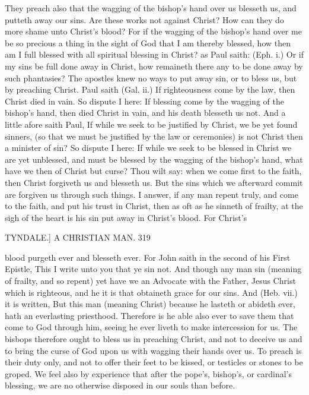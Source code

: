 \documentclass{custom}
\begin{document}
{They preach also that the wagging of the bishop's hand 
over us blesseth us, and putteth away our sins. Are these 
works not against Christ? How can they do more shame 
unto Christ's blood? For if the wagging of the bishop's 
hand over me be so precious a thing in the sight of God 
that I am thereby blessed, how then am I full blessed with 
all spiritual blessing in Christ? as Paul saith: (Eph. i.) 
Or if my sins be full done away in Christ, how remaineth 
there any to be done away by such phantasies? The 
apostles knew no ways to put away sin, or to bless us, but by 
preaching Christ. Paul saith (Gal. ii.) If righteousness 
come by the law, then Christ died in vain. So dispute I 
here: If blessing come by the wagging of the bishop's 
hand, then died Christ in vain, and his death blesseth us 
not. And a little afore saith Paul, If while we seek to be 
justified by Christ, we be yet found sinners, (so that we 
must be justified by the law or ceremonies) is not Christ 
then a minister of sin? So dispute I here: If while we 
seek to be blessed in Christ we are yet unblessed, and 
must be blessed by the wagging of the bishop's hand, what 
have we then of Christ but curse? Thou wilt say: when we 
come first to the faith, then Christ forgiveth us and 
blesseth us. But the sins which we afterward commit are 
forgiven us through such things. I answer, if any man 
repent truly, and come to the faith, and put his trust in 
Christ, then as oft as he sinneth of frailty, at the sigh of the 
heart is his sin put away in Christ's blood. For Christ's 


TYNDALE.]
A CHRISTIAN MAN.
319

blood purgeth ever and blesseth ever. For John saith in 
the second of his First Epistle, This I write unto you that 
ye sin not. And though any man sin (meaning of frailty, 
and so repent) yet have we an Advocate with the Father, 
Jesus Christ which is righteous, and he it is that obtaineth 
grace for our sins. And (Heb. vii.) it is written, But this 
man (meaning Christ) because he lasteth or abideth ever, 
hath an everlasting priesthood. Therefore is he able also 
ever to save them that come to God through him, seeing 
he ever liveth to make intercession for us. The bisbops 
therefore ought to bless us in preaching Christ, and not 
to deceive us and to bring the curse of God upon us with 
wagging their hands over us. To preach is their duty 
only, and not to offer their feet to be kissed, or testicles or 
stones to be groped. We feel also by experience that 
after the pope's, bishop's, or cardinal's blessing, we are 
no otherwise disposed in our souls than before. 

}
\end{document}
